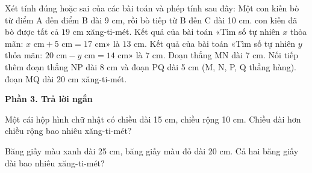 \begin{ex} %
Xét tính đúng hoặc sai của các bài toán và phép tính sau đây:
\choiceTF
{\True Một con kiến bò từ điểm A đến điểm B dài 9 cm, rồi bò tiếp từ B đến C dài 10 cm. con kiến đã bò được tất cả $19\text{ cm}$ xăng-ti-mét.}
{Kết quả của bài toán «Tìm số tự nhiên $x$ thỏa mãn: $x\text{ cm} + 5\text{ cm} = 17\text{ cm}$» là $13\text{ cm}$.}
{Kết quả của bài toán «Tìm số tự nhiên $y$ thỏa mãn: $20\text{ cm} - y\text{ cm} = 14\text{ cm}$» là $7\text{ cm}$.}
{\True Đoạn thẳng MN dài 7 cm. Nối tiếp thêm đoạn thẳng NP dài 8 cm và đoạn PQ dài 5 cm (M, N, P, Q thẳng hàng). đoạn MQ dài $20\text{ cm}$ xăng-ti-mét.}
\end{ex}

\textbf{Phần 3. Trả lời ngắn}

\begin{ex} %
Một cái hộp hình chữ nhật có chiều dài 15 cm, chiều rộng 10 cm. Chiều dài hơn chiều rộng bao nhiêu xăng-ti-mét?
\end{ex}

\begin{ex} %
Băng giấy màu xanh dài 25 cm, băng giấy màu đỏ dài 20 cm. Cả hai băng giấy dài bao nhiêu xăng-ti-mét?
\end{ex}

